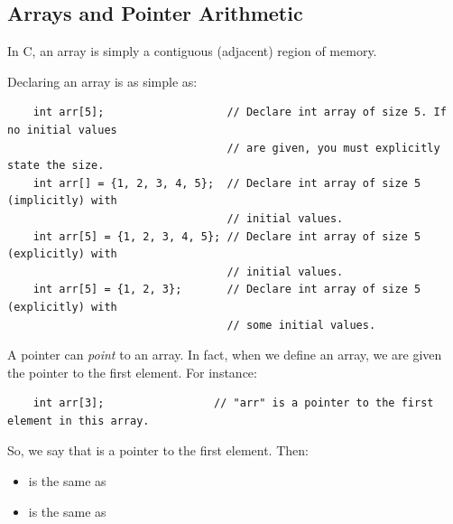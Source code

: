 \documentclass[letterpaper]{article}
\begin{document}
\subsection{Arrays and Pointer Arithmetic}
In C, an array is simply a contiguous (adjacent) region of memory. 

\bigskip 

Declaring an array is as simple as:
\begin{verbatim}
    int arr[5];                   // Declare int array of size 5. If no initial values
                                  // are given, you must explicitly state the size.
    int arr[] = {1, 2, 3, 4, 5};  // Declare int array of size 5 (implicitly) with 
                                  // initial values.
    int arr[5] = {1, 2, 3, 4, 5}; // Declare int array of size 5 (explicitly) with 
                                  // initial values.
    int arr[5] = {1, 2, 3};       // Declare int array of size 5 (explicitly) with 
                                  // some initial values.
\end{verbatim}

A pointer can \emph{point} to an array. In fact, when we define an array, we are given the pointer to the first element. For instance:
\begin{verbatim}
    int arr[3];                 // "arr" is a pointer to the first element in this array.
\end{verbatim}

So, we say that  is a pointer to the first element. Then:
\begin{itemize}
    \item {} is the same as 
    \item {} is the same as 
\end{itemize}
\end{document}
